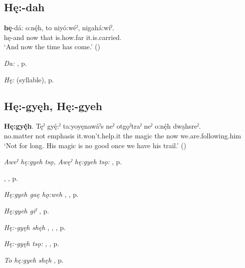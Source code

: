 \subsection*{\textbf{Hę:-dah} } \label{p:[hę:-dah]}

\ea
\label{ex:hpar29}
\gll \textbf{hę}-dá: o:nę́h, to niyó:wéˀ, nigahá:wíˀ.\\
hę-and now that is.how.far it.is.carried.\\
\glt ‘And now the time has come.’ (\cite{foster_earth_1974})
\z


\begin{CayugaRelated}
\item \textit{Da:} , p. \pageref{p:[da:]}\\
\item \textit{Hę:} (syllable), p. \pageref{p:[hę:] syllable}
\end{CayugaRelated}

\subsection*{\textbf{Hę:-gyęh, Hę:-gyeh} } \label{p:[hę:-gyęh]}

\ea
\label{ex:hpar30}
\gll \textbf{Hę:gyę́h}. Tęˀ gyę́:ˀ ta:yoyęnawáˀs neˀ otgǫˀtraˀ neˀ o:nę́h dwa̱hsreˀ.\\
no.matter not emphasis it.won’t.help.it the magic the now we.are.following.him\\
\glt ‘Not for long. His magic is no good once we have his trail.’ (\cite{carrier_legends_2013})
\z


\begin{CayugaRelated}
\item \textit{Aweˀ hę:gyeh tsǫ, Awęˀ hę:gyeh tsǫ:} , p. \pageref{p:[aweˀ hę:gyeh tsǫ:]}\\
\item {} , , p. \pageref{p:[-gyęh]}\\
\item \textit{Hę:gyeh gaę hǫ:weh} , , p. \pageref{p:[hę:-gyeh gaę hǫ:weh]}\\
\item \textit{Hę:gyeh giˀ} , p. \pageref{p:[hę:-gyeh giˀ]}\\
\item \textit{Hę:-gyęh shęh} , , , p. \pageref{p:[hę:-gyęh shęh]}\\
\item \textit{Hę:-gyęh tsǫ:} , , p. \pageref{p:[hę:-gyęh tsǫ:]}\\
\item \textit{To hę:gyeh shęh} , p. \pageref{p:[to hę:gyeh shęh]}
\end{CayugaRelated}

